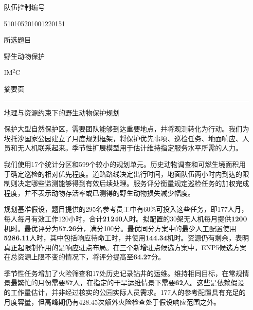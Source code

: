 \documentclass[12pt,a4paper]{article}
\newcommand{\TeamNumber}{510105201001220151}
\numberwithin{equation}{section}
\begin{document}
\thispagestyle{fancy}
\begin{center}
{\fontsize{12}{14.4}\selectfont 队伍控制编号}\par
\vspace{2pt}
{\fontsize{18}{21.6}\selectfont\color{red}\TeamNumber}\par
\vspace{3pt}
{\fontsize{12}{14.4}\selectfont 所选题目}\par
{\fontsize{12}{14.4}\selectfont\color{red}野生动物保护}\par
{\fontsize{14}{16.8}}\par
{\fontsize{12}{14.4}\selectfont IM$^2$C}\par
{\fontsize{12}{14.4}\selectfont 摘要页}\par
\end{center}
\vspace{4pt}
\noindent\rule{\linewidth}{1.2pt}
\vspace{4pt}
\begin{center}
{\fontsize{14}{16.8}\selectfont 地理与资源约束下的野生动物保护规划}
\end{center}

保护大型自然保护区，需要团队能够到达重要地点，并将观测转化为行动。我们为埃托沙国家公园建立了月度规划框架，将保护优先事项、巡检任务、地面响应、人员和无人机联系起来。季节性扩展模型用于估计维持指定服务水平所需的人力。

我们使用17个统计分区和599个较小的规划单元。历史动物调查和可燃生境面积用于确定巡检的相对优先程度。道路路线决定出行时间，地面队伍两小时内到达的限制则决定哪些监测能够得到有效后续处理。服务评分衡量规定巡检任务的加权完成程度，并不表示动物存活率或已测得的野生动物损失减少幅度。

规划基准假设，题目提供的295名参考员工中有60\%可投入这些任务，即177人月，每人每月有效工作120小时，合计\textbf{21240}人时。拟配置的30架无人机每月提供\textbf{1200}机时。最优评分为\textbf{57.26}分，满分100分。最优同分方案中的最少人工配置使用\textbf{5286.11}人时，其中包括响应待命工时，并使用\textbf{144.34}机时。资源仍有剩余，表明真正起限制作用的是响应驻点布局。在三个新增驻点候选方案中，ENP5候选方案在总资源上限不变的情况下，将评分提高至\textbf{64.27}分。

季节性任务增加了火险筛查和17处历史记录钻井的运维。维持相同目标，在常规情景最繁忙的月份需要\textbf{57}人，在指定的干旱运维情景下需要\textbf{62}人。这些是依赖假设的工作量估计，并非经过核实的公园实际人员需求。177人的参考配置具有充足的月度容量，但高峰期仍有428.45次额外火险检查处于假设响应范围之外。
\end{document}
